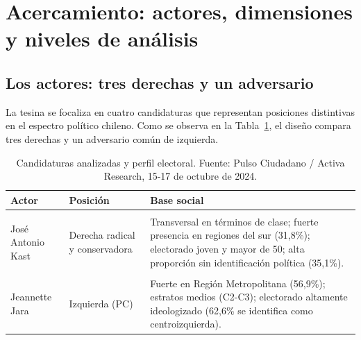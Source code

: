 \documentclass[
  letterpaper,
  numbers=noendperiod,
  fontsize=11pt,
  DIV=12,
  titlepage=false]{scrreprt}
\begin{document}
\section{Acercamiento: actores, dimensiones y niveles de
análisis}\label{acercamiento-actores-dimensiones-y-niveles-de-anuxe1lisis}

\subsection{Los actores: tres derechas y un
adversario}\label{los-actores-tres-derechas-y-un-adversario}

La tesina se focaliza en cuatro candidaturas que representan posiciones
distintivas en el espectro político chileno. Como se observa en la
Tabla~\ref{tbl-candidaturas-actores}, el diseño compara tres derechas y
un adversario común de izquierda.

\begingroup\fontsize{10}{12}\selectfont

\begin{longtable}[t]{>{\raggedright\arraybackslash}p{4.2cm}>{\raggedright\arraybackslash}p{4.2cm}>{\raggedright\arraybackslash}p{6cm}}

\caption{\label{tbl-candidaturas-actores}Candidaturas analizadas y
perfil electoral. Fuente: Pulso Ciudadano / Activa Research, 15-17 de
octubre de 2024.}

\tabularnewline

\toprule
Actor & Posición & Base social\\
\midrule
\cellcolor{gray!10}{Evelyn Matthei} & \cellcolor{gray!10}{Derecha tradicional} & \cellcolor{gray!10}{Mayoría femenina (60,4\%), mayores de 50 años (54\%), estratos medios-altos (C1-C2); alta proporción sin identificación política (40,1\%).}\\
José Antonio Kast & Derecha radical y conservadora & Transversal en términos de clase; fuerte presencia en regiones del sur (31,8\%); electorado joven y mayor de 50; alta proporción sin identificación política (35,1\%).\\
\cellcolor{gray!10}{Johannes Kaiser} & \cellcolor{gray!10}{Derecha libertaria} & \cellcolor{gray!10}{Mayoría masculina (55,5\%); concentrado en mayores de 50 años (50,2\%) y estratos bajos (C3-D/E); presencia en sur y centro del país.}\\
Jeannette Jara & Izquierda (PC) & Fuerte en Región Metropolitana (56,9\%); estratos medios (C2-C3); electorado altamente ideologizado (62,6\% se identifica como centroizquierda).\\
\bottomrule

\end{longtable}
\end{document}
